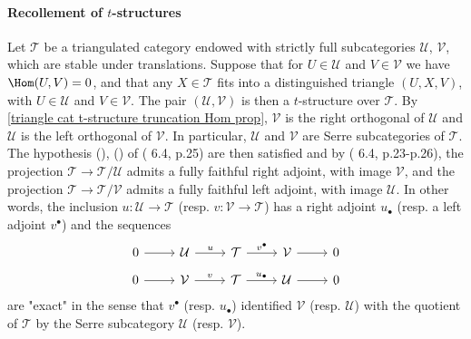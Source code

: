 \paragraph{Recollement of \texorpdfstring{$t$}{t}-structures}\label{triangle cat t-structure recollement paragraph}
Let $\mathcal{T}$ be a triangulated category endowed with strictly full subcategories $\mathcal{U}$, $\mathcal{V}$, which are stable under translations. Suppose that for $U\in\mathcal{U}$ and $V\in\mathcal{V}$ we have $\Hom(U,V)=0$, and that any $X\in\mathcal{T}$ fits into a distinguished triangle $(U,X,V)$, with $U\in\mathcal{U}$ and $V\in\mathcal{V}$. The pair $(\mathcal{U},\mathcal{V})$ is then a $t$-structure over $\mathcal{T}$. By \cref{triangle cat t-structure truncation Hom prop}, $\mathcal{V}$ is the right orthogonal of $\mathcal{U}$ and $\mathcal{U}$ is the left orthogonal of $\mathcal{V}$. In particular, $\mathcal{U}$ and $\mathcal{V}$ are Serre subcategories of $\mathcal{T}$. The hypothesis (), () of (\cite{tohoku} 6.4, p.25) are then satisfied and by (\cite{tohoku} 6.4, p.23-p.26), the projection $\mathcal{T}\to\mathcal{T}/\mathcal{U}$ admits a fully faithful right adjoint, with image $\mathcal{V}$, and the projection $\mathcal{T}\to\mathcal{T}/\mathcal{V}$ admits a fully faithful left adjoint, with image $\mathcal{U}$. In other words, the inclusion $u:\mathcal{U}\to\mathcal{T}$ (resp. $v:\mathcal{V}\to\mathcal{T}$) has a right adjoint $u_\bullet$ (resp. a left adjoint $v^\bullet$) and the sequences
\[\begin{tikzcd}
0\ar[r]&\mathcal{U}\ar[r,"u"]&\mathcal{T}\ar[r,"v^\bullet"]&\mathcal{V}\ar[r]&0
\end{tikzcd}\]
\vspace*{-4mm}
\[\begin{tikzcd}
0\ar[r]&\mathcal{V}\ar[r,"v"]&\mathcal{T}\ar[r,"u_\bullet"]&\mathcal{U}\ar[r]&0
\end{tikzcd}\]
are "exact" in the sense that $v^\bullet$ (resp. $u_\bullet$) identified $\mathcal{V}$ (resp. $\mathcal{U}$) with the quotient of $\mathcal{T}$ by the Serre subcategory $\mathcal{U}$ (resp. $\mathcal{V}$).\par

